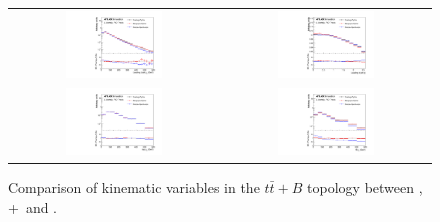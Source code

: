 \begin{figure}[p]
\begin{center}
\begin{tabular}{cc}
\includegraphics[width=0.48\textwidth]{Modeling/Figures/default_tt1gbbq_q1_pt_norm} &
\includegraphics[width=0.48\textwidth]{Modeling/Figures/default_tt1gbbq_q1_eta_norm} \\
\includegraphics[width=0.48\textwidth]{Modeling/Figures/default_tt1gbbq_top_pt_norm} &
\includegraphics[width=0.48\textwidth]{Modeling/Figures/default_tt1gbbq_ttbar_pt_norm} \\
\end{tabular}
\caption{Comparison of kinematic variables in the $t\bar{t}+B$ topology between \PP, \madgraph+\pythia\ and \ShOL.}
\label{fig:default_tt1gbb}
\end{center}
\end{figure}
